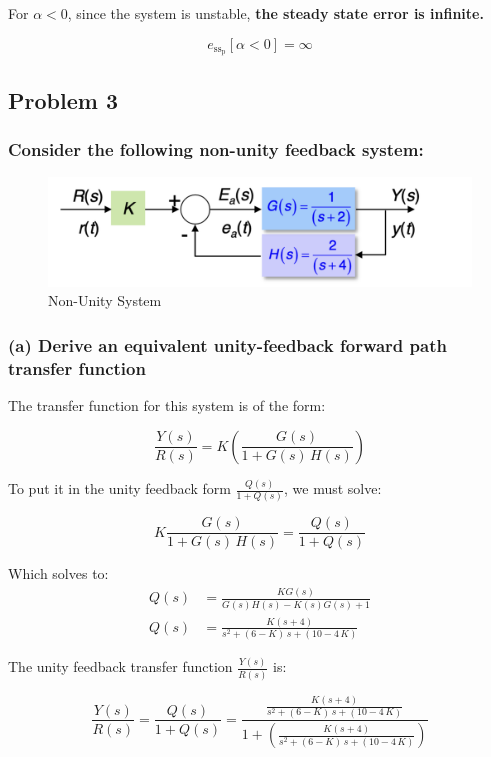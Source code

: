 \documentclass[12pt, letterpaper]{../assignment}
\begin{document}
\begin{answer}
For $\alpha < 0$, since the system is unstable, \textbf{the steady state error is infinite.}

$$ {e_{\text{ss}_\text{p}}}[\alpha < 0] = \infty $$
\end{answer}
\subsection*{Problem 3}
\subsubsection*{Consider the following non-unity feedback system:}

\begin{figure}[H]
    \centering
    \includegraphics[width=0.7\linewidth]{./figures/Q3_diagram.png}
    \caption{Non-Unity System}
    \label{fig:q3}
\end{figure}

\subsubsection*{(a) Derive an equivalent unity-feedback forward path transfer function}

The transfer function for this system is of the form:

$$ \frac{Y(s)}{R(s)} = K \left(\frac{ G(s)}{1+ G(s)\,H(s)} \right)$$

To put it in the unity feedback form $\frac{Q(s)}{1+Q(s)}$, we must solve:

$$ K \frac{ G(s)}{1+ G(s)\,H(s)} = \frac{Q(s)}{1+Q(s)} $$

Which solves to:
\begin{equation*}
\begin{aligned}
    Q(s) &= \frac{K G(s)}{G(s) H(s) - K(s) G(s) + 1 }\\
    Q(s) &= \frac{K (s+4)}{s^2 + (6 - K)\,s +(10-4\,K)}
\end{aligned}
\end{equation*}

The unity feedback transfer function $\frac{Y(s)}{R(s)}$ is:
\begin{answer}
    $$ \frac{Y(s)}{R(s)} = \frac{Q(s)}{1+Q(s)} = \frac{\frac{K (s+4)}{s^2 + (6 - K)\,s +(10-4\,K)}}{1+\left(\frac{K (s+4)}{s^2 + (6 - K)\,s +(10-4\,K)}\right)} $$
\end{answer}
\end{document}
